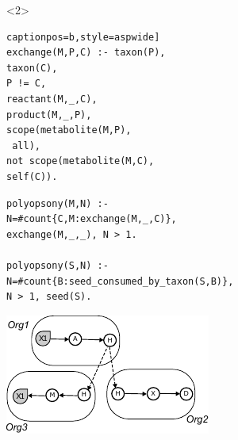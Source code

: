 \documentclass[8pt,usenames,dvipsnames]{beamer}
\begin{document}
\begin{frame}[fragile]
\begin{onlyenv}
\begin{minipage}{0.45\textwidth}
\end{minipage}
\end{onlyenv}

\begin{onlyenv}<2>
\begin{minipage}{0.5\textwidth}
\begin{lstlisting}[mathescape=True, label={lst:echange}] captionpos=b,style=aspwide]
exchange(M,P,C) :- taxon(P),
taxon(C),
P != C,
reactant(M,_,C),
product(M,_,P),
scope(metabolite(M,P),
 all),
not scope(metabolite(M,C), 
self(C)).
\end{lstlisting}
\begin{lstlisting}[mathescape=True,label={lst:competition}, captionpos=b]
polyopsony(M,N) :- 
N=#count{C,M:exchange(M,_,C)},
exchange(M,_,_), N > 1.
		 	
polyopsony(S,N) :-
N=#count{B:seed_consumed_by_taxon(S,B)}, 
N > 1, seed(S).
\end{lstlisting}
\end{minipage}%
\hspace{0.25cm}
\hfill
\begin{minipage}{0.45\textwidth}
\includegraphics[width=\textwidth]{figures/exchanged.pdf}
\end{minipage}
\end{onlyenv}
\end{frame}
\end{document}
